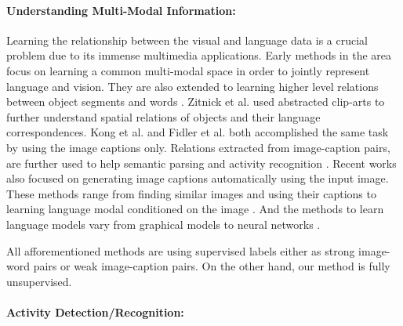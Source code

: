 \paragraph{Understanding Multi-Modal Information:}
Learning the relationship between the visual and language data is a crucial problem due to its immense multimedia applications. Early methods \cite{matching} in the area focus on learning a common multi-modal space in order to jointly represent language and vision. They are also extended to learning higher level relations between object segments and words \cite{connecting}. Zitnick et al.\cite{zitnick2013learning,zitnick2013bringing} used abstracted clip-arts to further understand spatial relations of objects and their language correspondences. Kong et al. \cite{kong2014you} and Fidler et al. \cite{fidler2013sentence} both accomplished the same task by using the image captions only. Relations extracted from image-caption pairs, are further used to help semantic parsing \cite{yu2013grounded} and activity recognition \cite{motwani2012improving}. Recent works also focused on generating image captions automatically using the input image. These methods range from finding similar images and using their captions \cite{ordonez2011im2text} to learning language modal conditioned on the image \cite{kiros2014multimodal,socher2014grounded,farhadi2010every}. And the methods to learn language models vary from graphical models \cite{farhadi2010every} to neural networks \cite{socher2014grounded,kiros2014multimodal,deepAlignment}.

All afforementioned methods are using supervised labels either as strong image-word pairs or weak image-caption pairs. On the other hand, our method is fully unsupervised.

\paragraph{Activity Detection/Recognition:}

